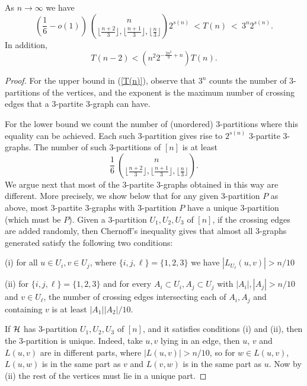 \documentclass[11pt]{article}
\begin{document}
\begin{lemma}\label{tnincreasing}As $n \rightarrow \infty$ we have
\begin{equation} \label{T(n)}
\left(\frac{1}{6}-o(1)\right) \ \binom{n}{\lfloor\frac{n+2}{3}\rfloor,
\lfloor\frac{n+1}{3}\rfloor, \lfloor\frac{n}{3}\rfloor} 2^{s(n)}\  < T(n) \  <  \
3^n 2^{s(n)}.\end{equation} In addition, \begin{equation}\label{tnn-2} T(n-2)<\left(n^{2} 2^{-\frac{2n^2}{9}+n}\right) T(n).\end{equation}
\end{lemma}

\begin{proof}
 For the upper bound in (\ref{T(n)}), observe that $3^n$ counts the number of $3$-partitions
of the vertices, and the exponent is the maximum number of
crossing edges that a $3$-partite 3-graph can have.

 For the lower
bound we count the number of (unordered) $3$-partitions where this
equality can be achieved. Each such $3$-partition gives rise to $2^{s(n)}$ $3$-partite $3$-graphs.
The number of such 3-partitions of $[n]$ is at least
$$\frac{1}{6} \ \binom{n}{\lfloor\frac{n+2}{3}\rfloor,
\lfloor\frac{n+1}{3}\rfloor, \lfloor\frac{n}{3}\rfloor}.$$
We argue next that most of the  3-partite 3-graphs obtained in this way are different.  More precisely, we show below that for any given 3-partition $P$ as above, most 3-partite 3-graphs with 3-partition $P$ have a unique 3-partition (which must be $P$).
Given a $3$-partition $U_1,U_2,U_3$ of $[n]$, if the crossing edges are added randomly, then Chernoff's inequality gives that almost all 3-graphs generated
satisfy the following two conditions:

(i) for all $ u\in U_i, v\in U_j$, where $\{i,j,\ell\}=\{1,2,3\}$  we have $|L_{U_\ell}(u,v)| > n/10$

(ii) for $\{i,j,\ell\}=\{1,2,3\}$ and  for every $ A_i \subset U_i, A_j\subset U_j$ with $|A_i|, |A_j|> n/10$ and $v\in U_\ell$,  the number of crossing edges
 intersecting each of $A_i,A_j$ and containing $v$ is at least $|A_1||A_2|/10$.

 If $\mathcal{H}$ has $3$-partition $U_1,U_2,U_3$ of $[n]$, and it satisfies conditions (i) and (ii), then the $3$-partition is unique. Indeed, take $u,v$ lying in an edge, then $u$, $v$ and $L(u,v)$ are in different parts, where
$|L(u,v)|> n/10$, so for $w\in L(u,v)$, $L(u,w)$ is in the same part as $v$ and $L(v,w)$ is in the same part as  $u$.  Now by (ii) the rest of the vertices must lie in a unique part.


\end{proof}
\end{document}
